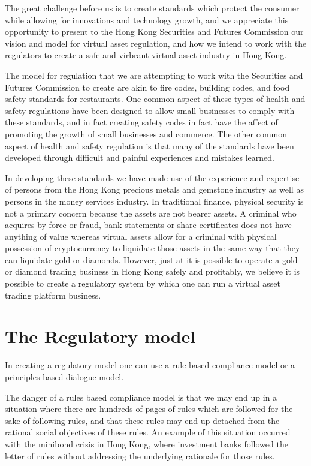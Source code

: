 The great challenge before us is to create standards which protect the
consumer while allowing for innovations and technology growth, and we
appreciate this opportunity to present to the Hong Kong Securities and
Futures Commission our vision and model for virtual asset regulation,
and how we intend to work with the regulators to create a safe and
virbrant virtual asset industry in Hong Kong.

The model for regulation that we are attempting to work with the
Securities and Futures Commission to create are akin to fire codes,
building codes, and food safety standards for restaurants.  One common
aspect of these types of health and safety regulations have been
designed to allow small businesses to comply with these standards, and
in fact creating safety codes in fact have the affect of promoting the
growth of small businesses and commerce.  The other common aspect of
health and safety regulation is that many of the standards have been
developed through difficult and painful experiences and mistakes
learned.

In developing these standards we have made use of the experience and
expertise of persons from the Hong Kong precious metals and gemstone
industry as well as persons in the money services industry.  In
traditional finance, physical security is not a primary concern
because the assets are not bearer assets.  A criminal who acquires by
force or fraud, bank statements or share certificates does not have
anything of value whereas virtual assets allow for a criminal with
physical possession of cryptocurrency to liquidate those assets in the
same way that they can liquidate gold or diamonds.  However, just at
it is possible to operate a gold or diamond trading business in Hong
Kong safely and profitably, we believe it is possible to create a
regulatory system by which one can run a virtual asset trading
platform business.

\section{The Regulatory model}

In creating a regulatory model one can use a rule based compliance
model or a principles based dialogue model.

The danger of a rules based compliance model is that we may end up in
a situation where there are hundreds of pages of rules which are
followed for the sake of following rules, and that these rules may end
up detached from the rational social objectives of these rules.  An
example of this situation occurred with the minibond crisis in Hong
Kong, where investment banks followed the letter of rules without
addressing the underlying rationale for those rules.

